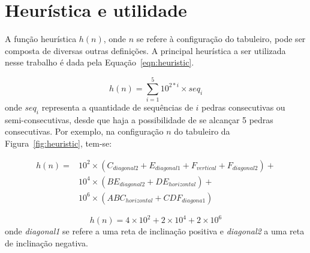 \documentclass[10pt,a4paper]{article}
\begin{document}
\newpage
\section{Heurística e utilidade} \label{sec:heuristica}

A função heurística $h(n)$, onde $n$ se refere à configuração do tabuleiro, pode ser composta de diversas outras definições. A principal heurística a ser utilizada nesse trabalho é dada pela Equação~\ref{eqn:heuristic}.

\begin{equation}\label{eqn:heuristic}
h(n) = \sum_{i=1}^{5} 10^{2*i} \times seq_i
\end{equation}
%
onde $seq_i$ representa a quantidade de sequências de $i$ pedras consecutivas ou semi-consecutivas, desde que haja a possibilidade de se alcançar 5 pedras consecutivas. Por exemplo, na configuração $n$ do tabuleiro da Figura~\ref{fig:heuristic}, tem-se:

\begin{equation*}
\begin{split}
h(n) = &10^2 \times (C_{diagonal2} + E_{diagonal1} + F_{vertical} + F_{diagonal2}) + \\
       &10^4 \times (BE_{diagonal2} + DE_{horizontal}) + \\
       &10^6 \times (ABC_{horizontal} + CDF_{diagona1})
\end{split}
\end{equation*}

\begin{equation*}
h(n) =  4 \times 10^2 + 2 \times 10^4 + 2 \times 10^6
\end{equation*}
%
onde \emph{diagonal1} se refere a uma reta de inclinação positiva e \emph{diagonal2} a uma reta de inclinação negativa. 
\end{document}
